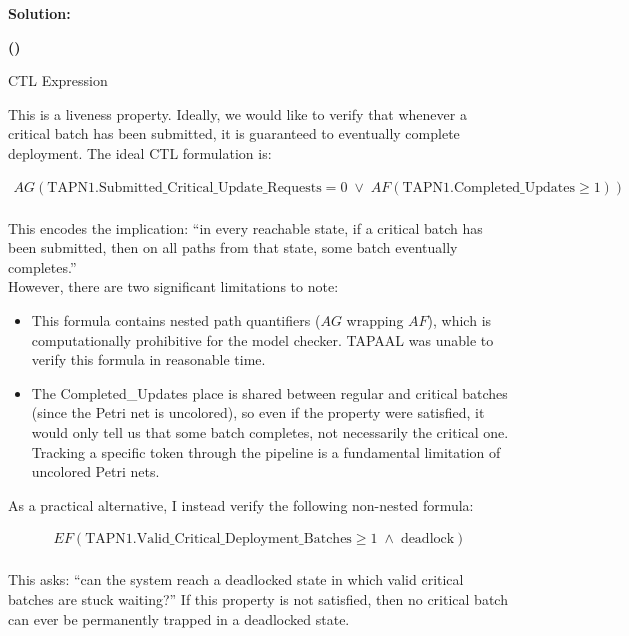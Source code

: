 \documentclass[10pt]{article}
\newenvironment{solution}{
	\vspace{1em}\par\large\textbf{{Solution:}}\par\vspace{1em}
}{
	\vspace{1em}
}
\newcounter{step}
\renewcommand{\thestep}{\Roman{step}}
\newenvironment{step}{
	\refstepcounter{step}
	\vspace{1.5em}\par\noindent\large\textbf{(\thestep)}
}{
	\par
	\vspace{1.5em}
}
\begin{document}
\begin{solution}

	\begin{step}
		CTL Expression
	\end{step}

	This is a liveness property. Ideally, we would like to verify that whenever a critical batch has been submitted, it is guaranteed to eventually complete deployment. The ideal CTL formulation is:

	\begin{align*}
		AG\left(\text{TAPN1.Submitted\_Critical\_Update\_Requests} = 0 \;\lor\; AF\left(\text{TAPN1.Completed\_Updates} \ge 1\right)\right) \\
	\end{align*}

	This encodes the implication: ``in every reachable state, if a critical batch has been submitted, then on all paths from that state, some batch eventually completes.'' \\

	However, there are two significant limitations to note:

	\begin{itemize}
		\item This formula contains nested path quantifiers ($AG$ wrapping $AF$), which is computationally prohibitive for the model checker. TAPAAL was unable to verify this formula in reasonable time.
		\item The Completed\_Updates place is shared between regular and critical batches (since the Petri net is uncolored), so even if the property were satisfied, it would only tell us that some batch completes, not necessarily the critical one. Tracking a specific token through the pipeline is a fundamental limitation of uncolored Petri nets.
	\end{itemize}

	As a practical alternative, I instead verify the following non-nested formula:

	\begin{align*}
		EF\left(\text{TAPN1.Valid\_Critical\_Deployment\_Batches} \ge 1 \;\land\; \text{deadlock}\right) \\
	\end{align*}

	This asks: ``can the system reach a deadlocked state in which valid critical batches are stuck waiting?'' If this property is not satisfied, then no critical batch can ever be permanently trapped in a deadlocked state.


\end{solution}
\end{document}
